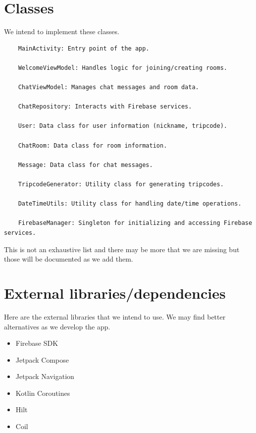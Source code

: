 \documentclass{article}
\begin{document}
\section{Classes}
We intend to implement these classes.
\begin{verbatim}
    MainActivity: Entry point of the app.
    
    WelcomeViewModel: Handles logic for joining/creating rooms.
    
    ChatViewModel: Manages chat messages and room data.
    
    ChatRepository: Interacts with Firebase services.
    
    User: Data class for user information (nickname, tripcode).
    
    ChatRoom: Data class for room information.
    
    Message: Data class for chat messages.
    
    TripcodeGenerator: Utility class for generating tripcodes.
    
    DateTimeUtils: Utility class for handling date/time operations.
    
    FirebaseManager: Singleton for initializing and accessing Firebase services.
    \end{verbatim}
This is not an exhaustive list and there may be more that we are missing but those will be documented as we add them.

\newpage
\section{External libraries/dependencies}
Here are the external libraries that we intend to use. We may find better alternatives as we develop the app.

\begin{itemize}
    \item Firebase SDK
    \item Jetpack Compose
    \item Jetpack Navigation
    \item Kotlin Coroutines
    \item Hilt
    \item Coil
\end{itemize}
\end{document}
